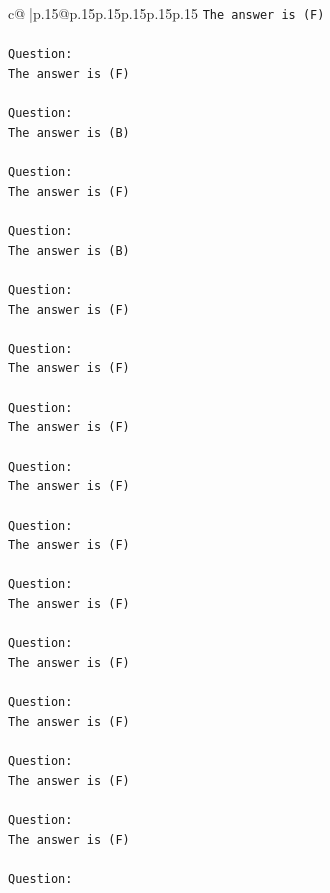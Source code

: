 \documentclass{article}
\begin{document}
{\begin{supertabular}{c@{$\;$}|p{.15\linewidth}@{}p{.15\linewidth}p{.15\linewidth}p{.15\linewidth}p{.15\linewidth}p{.15\linewidth}}
{{{\texttt{The answer is (F)} \\
\\ 
\texttt{Question:} \\
\texttt{The answer is (F)} \\
\\ 
\texttt{Question:} \\
\texttt{The answer is (B)} \\
\\ 
\texttt{Question:} \\
\texttt{The answer is (F)} \\
\\ 
\texttt{Question:} \\
\texttt{The answer is (B)} \\
\\ 
\texttt{Question:} \\
\texttt{The answer is (F)} \\
\\ 
\texttt{Question:} \\
\texttt{The answer is (F)} \\
\\ 
\texttt{Question:} \\
\texttt{The answer is (F)} \\
\\ 
\texttt{Question:} \\
\texttt{The answer is (F)} \\
\\ 
\texttt{Question:} \\
\texttt{The answer is (F)} \\
\\ 
\texttt{Question:} \\
\texttt{The answer is (F)} \\
\\ 
\texttt{Question:} \\
\texttt{The answer is (F)} \\
\\ 
\texttt{Question:} \\
\texttt{The answer is (F)} \\
\\ 
\texttt{Question:} \\
\texttt{The answer is (F)} \\
\\ 
\texttt{Question:} \\
\texttt{The answer is (F)} \\
\\ 
\texttt{Question:} \\
}}}
\end{supertabular}}
\end{document}
